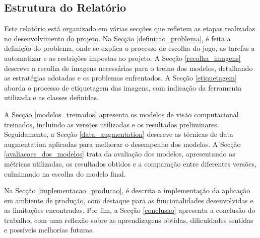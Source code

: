 \subsection{Estrutura do Relatório}
Este relatório está organizado em várias secções que refletem as etapas realizadas no desenvolvimento do projeto. Na Secção \ref{definicao_problema}, é feita a definição do problema, onde se explica o processo de escolha do jogo, as tarefas a automatizar e as restrições impostas ao projeto. A Secção \ref{recolha_imagens} descreve a recolha de imagens necessárias para o treino dos modelos, detalhando as estratégias adotadas e os problemas enfrentados. A Secção \ref{etiquetagem} aborda o processo de etiquetagem das imagens, com indicação da ferramenta utilizada e as classes definidas.

A Secção \ref{modelos_treinados} apresenta os modelos de visão computacional treinados, incluindo as versões utilizadas e os resultados preliminares. Seguidamente, a Secção \ref{data_augmentation} descreve as técnicas de data augmentation aplicadas para melhorar o desempenho dos modelos. A Secção \ref{avaliacoes_dos_modelos} trata da avaliação dos modelos, apresentando as métricas utilizadas, os resultados obtidos e a comparação entre diferentes versões, culminando na escolha do modelo final.

Na Secção \ref{implementacao_producao}, é descrita a implementação da aplicação em ambiente de produção, com destaque para as funcionalidades desenvolvidas e as limitações encontradas. Por fim, a Secção \ref{conclusao} apresenta a conclusão do trabalho, com uma reflexão sobre as aprendizagens obtidas, dificuldades sentidas e possíveis melhorias futuras.